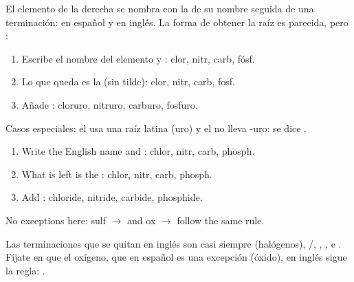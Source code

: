 El elemento de la derecha se nombra con la  de su nombre seguida de una terminación:  en español y  en inglés. La forma de obtener la raíz es parecida, pero :

\begin{reglas}
    \begin{enumerate}[label=\numberballgreen]
        \item Escribe el nombre del elemento y : clor, nitr, carb, fósf.
        \item Lo que queda es la  (sin tilde): clor, nitr, carb, fosf.
        \item Añade : cloruro, nitruro, carburo, fosfuro.
    \end{enumerate}
    Casos especiales: el  usa una raíz latina (uro) y el  no lleva -uro: se dice .
    \ingles
    \begin{enumerate}[label=\numberballgreen]
        \item Write the English name and : chlor, nitr, carb, phosph.
        \item What is left is the : chlor, nitr, carb, phosph.
        \item Add : chloride, nitride, carbide, phosphide.
    \end{enumerate}
    No exceptions here: sulf \(\to\)  and ox \(\to\)  follow the same rule.
\end{reglas}

Las terminaciones que se quitan en inglés son casi siempre  (halógenos), /, , ,  e . Fíjate en que el oxígeno, que en español es una excepción (óxido), en inglés sigue la regla: .





